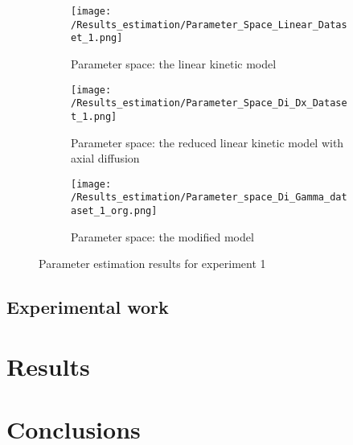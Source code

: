 \documentclass[a4paper,fleqn]{cas-dc}
\begin{document}
\begin{figure*}[!b]
	\centering
	\begin{subfigure}{0.3\textwidth}
		\centering
		\texttt{[image: /Results\_estimation/Parameter\_Space\_Linear\_Dataset\_1.png]}
		\caption{Parameter space: the linear kinetic model}
		\label{fig: Fit_1_linear}
	\end{subfigure}
	\hfill
	\begin{subfigure}{0.3\textwidth}
		\centering
		\texttt{[image: /Results\_estimation/Parameter\_Space\_Di\_Dx\_Dataset\_1.png]}
		\caption{Parameter space: the reduced linear kinetic model with axial diffusion}
		\label{fig: Fit_1_Di_Dx}
	\end{subfigure}
	\hfill
	\begin{subfigure}{0.3\textwidth}
		\centering
		\texttt{[image: /Results\_estimation/Parameter\_space\_Di\_Gamma\_dataset\_1\_org.png]}
		\caption{Parameter space: the modified model}
		\label{fig: Fit_1_Di_Gamma}
	\end{subfigure}
	\caption{Parameter estimation results for experiment 1}
\end{figure*}

\subsection{Experimental work}


\section{Results}


\section{Conclusions} \label{CH: Conclusion}
\end{document}
